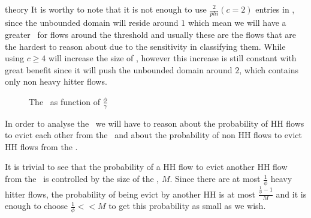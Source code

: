 \begin{maybeappendix}{theory}
It is worthy to note that it is not enough to use $\frac{2}{phi} (c=2)$ entries in \sfa, since the unbounded domain will reside around $1$ which mean we will have a greater \pe\ for flows around the threshold and usually these are the flows that are the hardest to reason about due to the sensitivity in classifying them. While using $c\geq 4$ will increase the size of \sfa, however this increase is still constant with great benefit since it will push the unbounded domain around $2$, which contains only non heavy hitter flows.

\begin{figure}
    \centering
    \caption{The \pe\ as function of $\frac{\phi}{\gamma}$}
    \label{fig:prop_err}
\end{figure}
\end{maybeappendix}

In order to analyse the \eve\ we will have to reason about the probability of HH flows to evict each other from the \cs\ and about the probability of non HH flows to evict HH flows from the \cs.

It is trivial to see that the probability of a HH flow to evict another HH flow from the \cs\ is controlled by the size of the \cs, $M$. Since there are at most $\frac{1}{\phi}$ heavy hitter flows, the probability of being evict by another HH is at most $\frac{\frac{1}{\phi}-1}{M}$ and it is enough to choose $\frac{1}{\phi} << M$ to get this probability as small as we wish.

